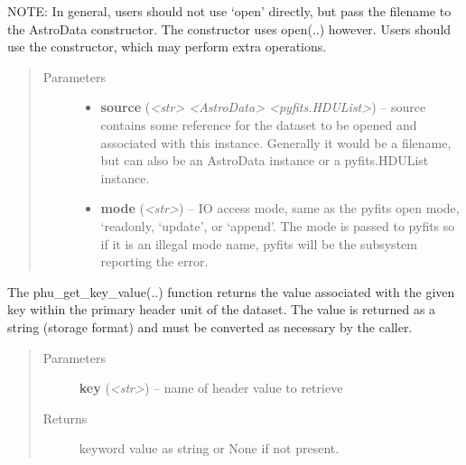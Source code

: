 \documentclass[letterpaper,10pt,english]{sphinxmanual}
\begin{document}
\begin{fulllineitems}
\begin{fulllineitems}
NOTE: In general, users should not use `open' directly, but pass
the filename to the AstroData constructor. The constructor uses
open(..) however. Users should use the constructor, which may 
perform extra operations.
\begin{quote}\begin{description}
\item[{Parameters}] \leavevmode\begin{itemize}
\item {} 
\textbf{source} (\emph{\textless{}str\textgreater{} \textbar{} \textless{}AstroData\textgreater{} \textbar{} \textless{}pyfits.HDUList\textgreater{}}) -- source contains some reference for the dataset to 
be opened and associated with this instance. Generally
it would be a filename, but can also be
an AstroData instance or a pyfits.HDUList instance.

\item {} 
\textbf{mode} (\emph{\textless{}str\textgreater{}}) -- IO access mode, same as the pyfits open mode, `readonly,
`update', or `append'.  The mode is passed to pyfits so
if it is an illegal mode name, pyfits will be the
subsystem reporting the error.

\end{itemize}

\end{description}\end{quote}

\end{fulllineitems}


\begin{fulllineitems}
\label{astro_class:astrodata.AstroData.AstroData.phu_get_key_value}
The phu\_get\_key\_value(..) function returns the value associated 
with the given key within the primary header unit of the dataset.
The value is returned as a string (storage format) and must be 
converted as necessary by the caller.
\begin{quote}\begin{description}
\item[{Parameters}] \leavevmode
\textbf{key} (\emph{\textless{}str\textgreater{}}) -- name of header value to retrieve

\item[{Returns}] \leavevmode
keyword value as string or None if not present.


\end{description}
\end{quote}
\end{fulllineitems}
\end{fulllineitems}
\end{document}
